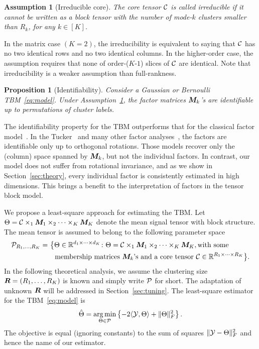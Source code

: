 \documentclass[11pt]{article}
\theoremstyle{plain}
\newtheorem{prop}{Proposition}
\newtheorem{ass}{Assumption}
\theoremstyle{definition}
\begin{document}
\begin{ass}[Irreducible core]\label{ass:core}
The core tensor $\mathcal{C}$ is called irreducible if it cannot be written as a block tensor with the number of mode-$k$ clusters smaller than $R_k$, for any $k\in[K]$. 
\end{ass}

In the matrix case $(K=2)$, the irreducibility is equivalent to saying that $\mathcal{C}$ has no two identical rows and no two identical columns. In the higher-order case, the assumption requires that none of order-($K$-$1$) slices of $\mathcal{C}$ are identical. Note that irreducibility is a weaker assumption than full-rankness. 

\begin{prop}[Identifiability]\label{prop:factors}
Consider a Gaussian or Bernoulli TBM~\eqref{eq:model}. Under Assumption~\ref{ass:core}, the factor matrices $\bm M_k$'s are identifiable up to permutations of cluster labels. 
\end{prop}

The identifiability property for the TBM outperforms that for the classical factor model~\cite{darton1980rotation,abdi2003factor}. In the Tucker~\cite{zhang2018tensor,kolda2009tensor} and many other factor analyses~\cite{darton1980rotation,abdi2003factor}, the factors are identifiable only up to orthogonal rotations. Those models recover only the (column) space spanned by $\bm M_k$, but not the individual factors. In contrast, our model does not suffer from rotational invariance, and as we show in Section~\ref{sec:theory}, every individual factor is consistently estimated in high dimensions. This brings a benefit to the interpretation of factors in the tensor block model.  

We propose a least-square approach for estimating the TBM. Let $\Theta=\mathcal{C}\times_1\bm M_1\times_2\cdots\times_K\bm M_K$ denote the mean signal tensor with block structure. The mean tensor is assumed to belong to the following parameter space
\begin{align}\label{eq:space}
\mathcal{P}_{R_1,\ldots,R_K}=&\ \big\{ \Theta\in\mathbb{R}^{d_1\times \cdots \times d_K}\colon \Theta=\mathcal{C}\times_1\bm M_1\times_2\cdots\times_K\bm M_K, \text{with some}\notag \\
 &\quad \text{membership matrices $\bm M_k$'s and a core tensor $\mathcal{C}\in\mathbb{R}^{R_1\times \cdots \times R_K}$}\big\}\notag .
\end{align}
In the following theoretical analysis, we assume the clustering size $\bm{R}=(R_1,\ldots,R_K)$ is known and simply write $\mathcal{P}$ for short. The adaptation of unknown $\bm{R}$ will be addressed in Section~\ref{sec:tuning}. The least-square estimator for the TBM~\eqref{eq:model} is
\begin{equation}\label{eq:estimate}
\hat \Theta=\operatorname*{arg\,min}_{\Theta\in\mathcal{P}}\left\{ -2\langle \mathcal{Y},\Theta\rangle + \lVert\Theta\rVert_F^2\right\}.
\end{equation}
The objective is equal (ignoring constants) to the sum of squares $\lVert\mathcal{Y}-\Theta\rVert_F^2$ and hence the name of our estimator. 
\end{document}
